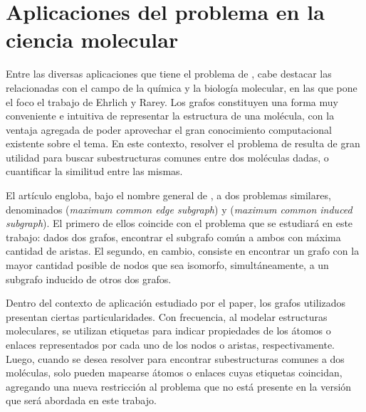 \section{Aplicaciones del problema en la ciencia molecular}


Entre las diversas aplicaciones que tiene el problema de , cabe
destacar las relacionadas con el campo de la química y la biología molecular,
en las que pone el foco el trabajo de Ehrlich y Rarey\cite{ehrlich}. Los
grafos constituyen una forma muy conveniente e intuitiva de representar la
estructura de una molécula, con la ventaja agregada de poder aprovechar el
gran conocimiento computacional existente sobre el tema. En este contexto,
resolver el problema de  resulta de gran utilidad para buscar
subestructuras comunes entre dos moléculas dadas, o cuantificar la similitud
entre las mismas.

El artículo engloba, bajo el nombre general de , a dos problemas
similares, denominados  (\emph{maximum common edge subgraph}) y
 (\emph{maximum common induced subgraph}). El primero de ellos
coincide con el problema que se estudiará en este trabajo: dados dos grafos,
encontrar el subgrafo común a ambos con máxima cantidad de aristas. El
segundo, en cambio, consiste en encontrar un grafo con la mayor cantidad
posible de nodos que sea isomorfo, simultáneamente, a un subgrafo inducido de
otros dos grafos.

Dentro del contexto de aplicación estudiado por el paper, los grafos
utilizados presentan ciertas particularidades. Con frecuencia, al modelar
estructuras moleculares, se utilizan etiquetas para indicar propiedades de los
átomos o enlaces representados por cada uno de los nodos o aristas,
respectivamente. Luego, cuando se desea resolver  para encontrar
subestructuras comunes a dos moléculas, solo pueden mapearse átomos o enlaces
cuyas etiquetas coincidan, agregando una nueva restricción al problema que no
está presente en la versión que será abordada en este trabajo.


